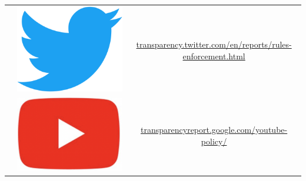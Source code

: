 \documentclass{article}
\begin{document}
\begin{landscape}
\begin{table}[p]
\begin{tabular}{|c|c|c|}
                                           & \includegraphics[scale=0.007]{./img/tw_logo.png}   & \href{https://transparency.twitter.com/en/reports/rules-enforcement.html}{transparency.twitter.com/en/reports/rules-enforcement.html}                \\ \cline{2-3} 
                                           & \includegraphics[scale=0.03]{./img/yt_logo.png}  & \href{https://transparencyreport.google.com/youtube-policy/}{transparencyreport.google.com/youtube-policy/}                              \\ \hline

\end{tabular}
\end{table}
\end{landscape}
\end{document}
